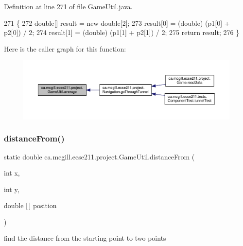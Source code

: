 Definition at line 271 of file Game\+Util.\+java.


\begin{DoxyCode}
271                                                      \{
272     \textcolor{keywordtype}{double}[] result = \textcolor{keyword}{new} \textcolor{keywordtype}{double}[2];
273     result[0] = (double) (p1[0] + p2[0]) / 2;
274     result[1] = (double) (p1[1] + p2[1]) / 2;
275     \textcolor{keywordflow}{return} result;
276   \}
\end{DoxyCode}
Here is the caller graph for this function\+:\nopagebreak
\begin{figure}[H]
\begin{center}
\leavevmode
\includegraphics[width=350pt]{classca_1_1mcgill_1_1ecse211_1_1project_1_1_game_util_ae5c5c445ab84516991219ca3783fcaa4_icgraph}
\end{center}
\end{figure}
\mbox{\label{classca_1_1mcgill_1_1ecse211_1_1project_1_1_game_util_a6fb324a3d5e42414c83dfd8bd5910b56}} 
\subsubsection{\texorpdfstring{distance\+From()}{distanceFrom()}}
{\footnotesize\ttfamily static double ca.\+mcgill.\+ecse211.\+project.\+Game\+Util.\+distance\+From (\begin{DoxyParamCaption}\item[{int}]{x,  }\item[{int}]{y,  }\item[{double \mbox{[}$\,$\mbox{]}}]{position }\end{DoxyParamCaption})\hspace{0.3cm}{\ttfamily [static]}}

find the distance from the starting point to two points


